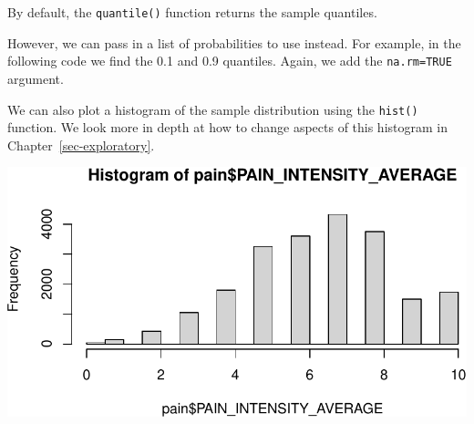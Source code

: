 \documentclass[
  letterpaper,
]{latex/krantz}
\makeatletter
\newenvironment{Shaded}{\begin{snugshade}}{\end{snugshade}}
\newcommand{\AttributeTok}[1]{\textcolor[rgb]{0.40,0.45,0.13}{#1}}
\newcommand{\CommentTok}[1]{\textcolor[rgb]{0.37,0.37,0.37}{#1}}
\newcommand{\ConstantTok}[1]{\textcolor[rgb]{0.56,0.35,0.01}{#1}}
\newcommand{\FloatTok}[1]{\textcolor[rgb]{0.68,0.00,0.00}{#1}}
\newcommand{\FunctionTok}[1]{\textcolor[rgb]{0.28,0.35,0.67}{#1}}
\newcommand{\NormalTok}[1]{\textcolor[rgb]{0.00,0.23,0.31}{#1}}
\newcommand{\SpecialCharTok}[1]{\textcolor[rgb]{0.37,0.37,0.37}{#1}}
\newenvironment{kframe}{%
\medskip{}
\setlength{\fboxsep}{.8em}
 \def\at@end@of@kframe{}%
 \ifinner\ifhmode%
  \def\at@end@of@kframe{\end{minipage}}%
  \begin{minipage}{\columnwidth}%
 \fi\fi%
 \def\FrameCommand##1{\hskip\@totalleftmargin \hskip-\fboxsep
 \colorbox{shadecolor}{##1}\hskip-\fboxsep
     \hskip-\linewidth \hskip-\@totalleftmargin \hskip\columnwidth}%
 \MakeFramed {\advance\hsize-\width
   \@totalleftmargin\z@ \linewidth\hsize
   \@setminipage}}%
 {\par\unskip\endMakeFramed%
 \at@end@of@kframe}
\renewenvironment{Shaded}{\begin{kframe}}{\end{kframe}}
\makeatother
\begin{document}
By default, the \texttt{quantile()} function returns the sample
quantiles.

\begin{Shaded}
\end{Shaded}

However, we can pass in a list of probabilities to use instead. For
example, in the following code we find the 0.1 and 0.9 quantiles. Again,
we add the \texttt{na.rm=TRUE} argument.

\begin{Shaded}
\end{Shaded}

We can also plot a histogram  of the sample
distribution using the
\texttt{hist()} function. We
look more in depth at how to change aspects of this histogram in
Chapter~\ref{sec-exploratory}.

\begin{Shaded}
\end{Shaded}

\begin{center}
\includegraphics[width=1\textwidth,height=\textheight]{book/working_data_files_files/figure-pdf/unnamed-chunk-12-1.pdf}
\end{center}
\end{document}
